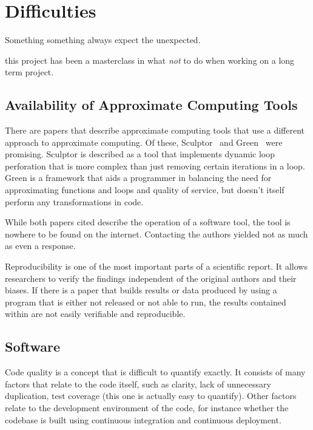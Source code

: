 \section*{Difficulties}

Something something always expect the unexpected.

this project has been a masterclass in what \textit{not} to do when working on a long term project.

\subsection{Availability of Approximate Computing Tools}
There are papers that describe approximate computing tools that use a different approach to approximate computing. Of these, Sculptor~\citep{li2018sculptor} and Green~\citep{baek2010green} were promising. Sculptor is described as a tool that implements dynamic loop perforation that is more complex than just removing certain iterations in a loop. Green is a framework that aids a programmer in balancing the need for approximating functions and loops and quality of service, but doesn't itself perform any transformations in code. 

While both papers cited describe the operation of a software tool, the tool is nowhere to be found on the internet. Contacting the authors yielded not as much as even a response. 

Reproducibility is one of the most important parts of a scientific report.
It allows researchers to verify the findings independent of the original authors and their biases.
If there is a paper that builds results or data produced by using a program that is either not released or not able to run, the results contained within are not easily verifiable and reproducible.

\subsection*{Software}
Code quality is a concept that is difficult to quantify exactly.
It consists of many factors that relate to the code itself, such as clarity, lack of unnecessary duplication,
test coverage (this one is actually easy to quantify).
Other factors relate to the development environment of the code, for instance whether the codebase is built using
continuous integration and continuous deployment.


